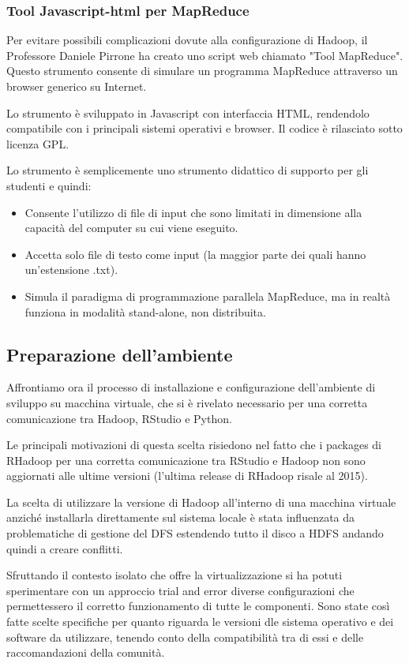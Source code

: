 \subsubsection{Tool Javascript-html per MapReduce}
Per evitare possibili complicazioni dovute alla configurazione di Hadoop, il Professore Daniele Pirrone ha creato uno script web chiamato "Tool MapReduce". Questo strumento consente di simulare un programma MapReduce attraverso un browser generico su Internet.

Lo strumento è sviluppato in Javascript con interfaccia HTML, rendendolo compatibile con i principali sistemi operativi e browser. Il codice è rilasciato sotto licenza GPL.

Lo strumento è semplicemente uno strumento didattico di supporto per gli studenti e quindi:
\begin{itemize}
    \item Consente l'utilizzo di file di input che sono limitati in dimensione alla capacità del computer su cui viene eseguito.
    \item Accetta solo file di testo come input (la maggior parte dei quali hanno un'estensione .txt).
    \item Simula il paradigma di programmazione parallela MapReduce, ma in realtà funziona in modalità stand-alone, non distribuita.
\end{itemize}


\subsection{Preparazione dell’ambiente}
Affrontiamo ora il processo di installazione e configurazione dell'ambiente di sviluppo su macchina virtuale, che si è rivelato necessario per una corretta comunicazione tra Hadoop, RStudio e Python.

Le principali motivazioni di questa scelta risiedono nel fatto che i packages di RHadoop per una corretta comunicazione tra RStudio e Hadoop non sono aggiornati alle ultime versioni (l’ultima release di RHadoop risale al 2015).

La scelta di utilizzare la versione di Hadoop all'interno di una macchina virtuale anziché installarla direttamente sul sistema locale è stata influenzata da problematiche di gestione del DFS estendendo tutto il disco a HDFS andando quindi a creare conflitti.

Sfruttando il contesto isolato che offre la virtualizzazione si ha potuti sperimentare con un approccio trial and error diverse configurazioni che permettessero il corretto funzionamento di tutte le componenti. Sono state così fatte scelte specifiche per quanto riguarda le versioni dle sistema operativo e dei software da utilizzare, tenendo conto della compatibilità tra di essi e delle raccomandazioni della comunità.

